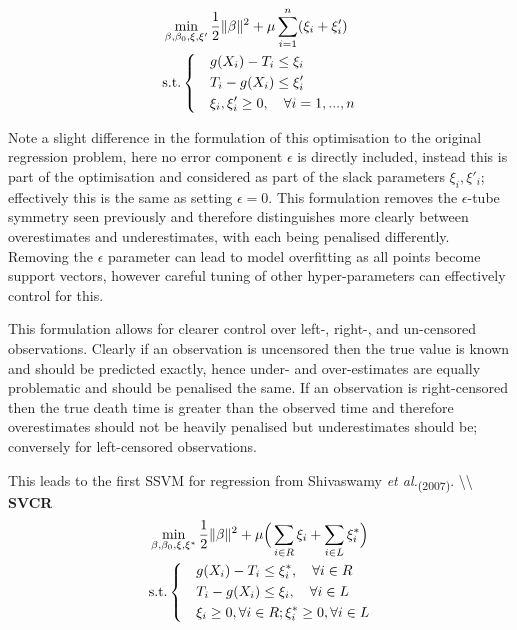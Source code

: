 \documentclass[
  letterpaper,
]{scrbook}
\theoremstyle{plain}
\theoremstyle{definition}
\theoremstyle{remark}
\begin{document}
\[
\begin{aligned}
& \min_{\beta, \beta_0, \xi, \xi'} \frac{1}{2}\|\beta\|^2 + \mu \sum^n_{i=1}(\xi_i + \xi_i') \\
& \textrm{s.t.}
\begin{dcases}
& g(X_i) - T_i \leq \xi_i \\
& T_i - g(X_i) \leq \xi'_i \\
& \xi_i, \xi_i' \geq 0, \quad \forall i = 1,...,n \\
\end{dcases}
\end{aligned}
\]

Note a slight difference in the formulation of this optimisation to the
original regression problem, here no error component \(\epsilon\) is
directly included, instead this is part of the optimisation and
considered as part of the slack parameters \(\xi_i, \xi'_i\);
effectively this is the same as setting \(\epsilon = 0\). This
formulation removes the \(\epsilon\)-tube symmetry seen previously and
therefore distinguishes more clearly between overestimates and
underestimates, with each being penalised differently. Removing the
\(\epsilon\) parameter can lead to model overfitting as all points
become support vectors, however careful tuning of other hyper-parameters
can effectively control for this.

This formulation allows for clearer control over left-, right-, and
un-censored observations. Clearly if an observation is uncensored then
the true value is known and should be predicted exactly, hence under-
and over-estimates are equally problematic and should be penalised the
same. If an observation is right-censored then the true death time is
greater than the observed time and therefore overestimates should not be
heavily penalised but underestimates should be; conversely for
left-censored observations.

This leads to the first SSVM for regression from Shivaswamy
\textit{et al.}\textsubscript{(2007)}\cite{Shivaswamy2007}.
\textbackslash\textbackslash{} \textbf{SVCR}\label{mod:svcr} \[
\begin{aligned}
& \min_{\beta, \beta_0, \xi, \xi^*} \frac{1}{2}\|\beta\|^2 + \mu\Big(\sum_{i \in R} \xi_i + \sum_{i \in L} \xi_i^*\Big) \\
& \textrm{s.t.}
\begin{dcases}
& g(X_i) - T_i \leq \xi^*_i, \quad \forall i \in R \\
& T_i - g(X_i) \leq \xi_i, \quad \forall i \in L \\
& \xi_i \geq 0, \forall i\in R; \xi^*_i \geq 0, \forall i \in L
\end{dcases}
\end{aligned}
\]
\end{document}
